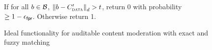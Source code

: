 \begin{figure}[h]
{\begin{minipage}[t]{0.45\textwidth}
\item If for all $\genericBlocklistElmt \in \blocklist$, $\distanceNotation[\distance][\genericBlocklistElmt][\clientMeta'] > \threshold$,  return 0 with probability $\ge 1 - \epsilon_\mathsf{fpr}$. Otherwise return 1. 



		
		\itemListEnd
		







		\enumListEnd




		\enumListEnd


\end{minipage}
}
\caption{Ideal functionality for auditable content moderation with exact and fuzzy matching\label{fig:ideal_func}}
\end{figure}